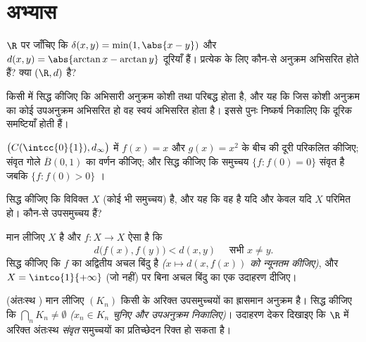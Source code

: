 \section{अभ्यास}

\begin{exercise}[$\star$]\label{exo:b2:metric:1}
$\R$ पर जाँचिए कि $\delta(x, y) = \min(1, \abs{x - y})$ और $d(x,y) = \abs{\arctan x - \arctan y}$ दूरियाँ हैं। प्रत्येक के लिए कौन-से अनुक्रम
अभिसरित होते हैं? क्या $(\R, d)$  है?
\end{exercise}

\begin{exercise}[$\star$]\label{exo:b2:metric:2}
किसी  में सिद्ध कीजिए कि अभिसारी अनुक्रम कोशी तथा परिबद्ध
होता है, और यह कि जिस कोशी अनुक्रम का कोई उपअनुक्रम अभिसरित हो वह स्वयं
अभिसरित होता है। इससे पुनः निष्कर्ष निकालिए कि  दूरिक समष्टियाँ
 होती हैं।
\end{exercise}

\begin{exercise}[$\star$]\label{exo:b2:metric:3}
$\bigl(C(\intcc{0}{1}), d_\infty\bigr)$ में $f(x) = x$ और $g(x) = x^2$ के बीच की दूरी परिकलित कीजिए; संवृत गोले $\overline B(0, 1)$ का
वर्णन कीजिए; और सिद्ध कीजिए कि समुच्चय $\{f : f(0) = 0\}$ संवृत है जबकि $\{f : f(0) > 0\}$ ।
\end{exercise}

\begin{exercise}[$\star\star$]\label{exo:b2:metric:4}
सिद्ध कीजिए कि विविक्त  $X$ (कोई भी समुच्चय)  है, और
यह कि वह  है यदि और केवल यदि $X$ परिमित हो। कौन-से उपसमुच्चय
 हैं?
\end{exercise}

\begin{exercise}[$\star\star$]\label{exo:b2:metric:5}
मान लीजिए $X$  है और $f \colon X \to X$ ऐसा है कि
\[
d\bigl(f(x), f(y)\bigr) < d(x, y) \quad \text{ सभी } x \neq y .
\]
सिद्ध कीजिए कि $f$ का अद्वितीय अचल बिंदु है \emph{($x \mapsto
d(x, f(x))$ को न्यूनतम
कीजिए)}, और $X = \intco{1}{+\infty}$ (जो  नहीं) पर बिना अचल बिंदु का एक उदाहरण दीजिए।
\end{exercise}

\begin{exercise}[$\star\star$]\label{exo:b2:metric:6}
(अंतःस्थ ) मान लीजिए $(K_n)$ किसी  के अरिक्त 
उपसमुच्चयों का ह्रासमान अनुक्रम है। सिद्ध कीजिए कि $\bigcap_n K_n \neq
\emptyset$ \emph{($x_n \in K_n$
चुनिए और उपअनुक्रम निकालिए)}। उदाहरण देकर दिखाइए कि $\R$ में अरिक्त
अंतःस्थ \emph{संवृत} समुच्चयों का प्रतिच्छेदन रिक्त हो सकता है।
\end{exercise}

